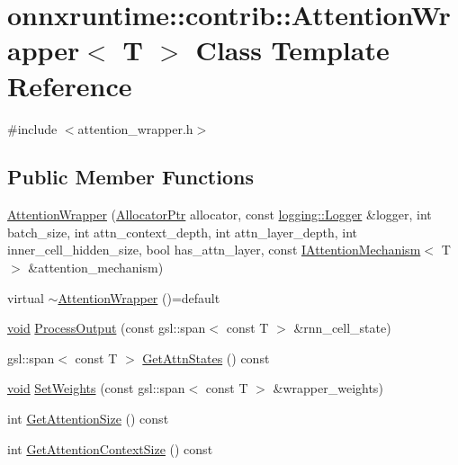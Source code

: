 \hypertarget{classonnxruntime_1_1contrib_1_1AttentionWrapper}{}\section{onnxruntime\+:\+:contrib\+:\+:Attention\+Wrapper$<$ T $>$ Class Template Reference}
\label{classonnxruntime_1_1contrib_1_1AttentionWrapper}


{\ttfamily \#include $<$attention\+\_\+wrapper.\+h$>$}

\subsection*{Public Member Functions}
\begin{DoxyCompactItemize}
\item 
\mbox{\hyperlink{classonnxruntime_1_1contrib_1_1AttentionWrapper_a4d30d5692fafbfb82a282595e5b92756}{Attention\+Wrapper}} (\mbox{\hyperlink{namespaceonnxruntime_a6cdac724c5dcefded3a63f08dae58fda}{Allocator\+Ptr}} allocator, const \mbox{\hyperlink{classonnxruntime_1_1logging_1_1Logger}{logging\+::\+Logger}} \&logger, int batch\+\_\+size, int attn\+\_\+context\+\_\+depth, int attn\+\_\+layer\+\_\+depth, int inner\+\_\+cell\+\_\+hidden\+\_\+size, bool has\+\_\+attn\+\_\+layer, const \mbox{\hyperlink{classonnxruntime_1_1contrib_1_1IAttentionMechanism}{I\+Attention\+Mechanism}}$<$ T $>$ \&attention\+\_\+mechanism)
\item 
virtual \mbox{\hyperlink{classonnxruntime_1_1contrib_1_1AttentionWrapper_acbf5eef271e8a8cac608d1d4b51f7b5c}{$\sim$\+Attention\+Wrapper}} ()=default
\item 
\mbox{\hyperlink{mlasi_8h_a88f941d423cb2a819b70a1358982b1a6}{void}} \mbox{\hyperlink{classonnxruntime_1_1contrib_1_1AttentionWrapper_a49dfb4da39265819061ddb3824b79023}{Process\+Output}} (const gsl\+::span$<$ const T $>$ \&rnn\+\_\+cell\+\_\+state)
\item 
gsl\+::span$<$ const T $>$ \mbox{\hyperlink{classonnxruntime_1_1contrib_1_1AttentionWrapper_a667a0b3d4e6b0f917a024fc452ded468}{Get\+Attn\+States}} () const
\item 
\mbox{\hyperlink{mlasi_8h_a88f941d423cb2a819b70a1358982b1a6}{void}} \mbox{\hyperlink{classonnxruntime_1_1contrib_1_1AttentionWrapper_ad8a0553c691ac852a17c9f3e993a8ab5}{Set\+Weights}} (const gsl\+::span$<$ const T $>$ \&wrapper\+\_\+weights)
\item 
int \mbox{\hyperlink{classonnxruntime_1_1contrib_1_1AttentionWrapper_afcd08301996741c5a16f30ee6a2e666a}{Get\+Attention\+Size}} () const
\item 
int \mbox{\hyperlink{classonnxruntime_1_1contrib_1_1AttentionWrapper_ab07de3a078cec083222479b6f849e656}{Get\+Attention\+Context\+Size}} () const
\end{DoxyCompactItemize}


